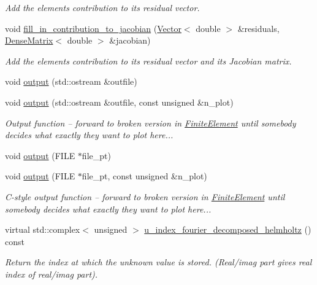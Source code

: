 \begin{DoxyCompactItemize}
\begin{DoxyCompactList}\small\item\em Add the element\textquotesingle{}s contribution to its residual vector. \end{DoxyCompactList}\item 
void \hyperlink{classoomph_1_1FourierDecomposedHelmholtzFluxElement_afca29e11428579eb58e4bca7f97b0151}{fill\+\_\+in\+\_\+contribution\+\_\+to\+\_\+jacobian} (\hyperlink{classoomph_1_1Vector}{Vector}$<$ double $>$ \&residuals, \hyperlink{classoomph_1_1DenseMatrix}{Dense\+Matrix}$<$ double $>$ \&jacobian)
\begin{DoxyCompactList}\small\item\em Add the element\textquotesingle{}s contribution to its residual vector and its Jacobian matrix. \end{DoxyCompactList}\item 
void \hyperlink{classoomph_1_1FourierDecomposedHelmholtzFluxElement_ad16dd86d02fc30d44ae9e25ddd6d1964}{output} (std\+::ostream \&outfile)
\item 
void \hyperlink{classoomph_1_1FourierDecomposedHelmholtzFluxElement_ab1840440fdc52e7e7f515cb4d57d5919}{output} (std\+::ostream \&outfile, const unsigned \&n\+\_\+plot)
\begin{DoxyCompactList}\small\item\em Output function -- forward to broken version in \hyperlink{classoomph_1_1FiniteElement}{Finite\+Element} until somebody decides what exactly they want to plot here... \end{DoxyCompactList}\item 
void \hyperlink{classoomph_1_1FourierDecomposedHelmholtzFluxElement_a08316af2339948cb05b4a8a3875c3dfc}{output} (F\+I\+LE $\ast$file\+\_\+pt)
\item 
void \hyperlink{classoomph_1_1FourierDecomposedHelmholtzFluxElement_ad09e029959ddf65ad88f2b3fbbddaa03}{output} (F\+I\+LE $\ast$file\+\_\+pt, const unsigned \&n\+\_\+plot)
\begin{DoxyCompactList}\small\item\em C-\/style output function -- forward to broken version in \hyperlink{classoomph_1_1FiniteElement}{Finite\+Element} until somebody decides what exactly they want to plot here... \end{DoxyCompactList}\item 
virtual std\+::complex$<$ unsigned $>$ \hyperlink{classoomph_1_1FourierDecomposedHelmholtzFluxElement_a0a1269a010ff411be800dbd79d0f0771}{u\+\_\+index\+\_\+fourier\+\_\+decomposed\+\_\+helmholtz} () const
\begin{DoxyCompactList}\small\item\em Return the index at which the unknown value is stored. (Real/imag part gives real index of real/imag part). \end{DoxyCompactList}\end{DoxyCompactItemize}
